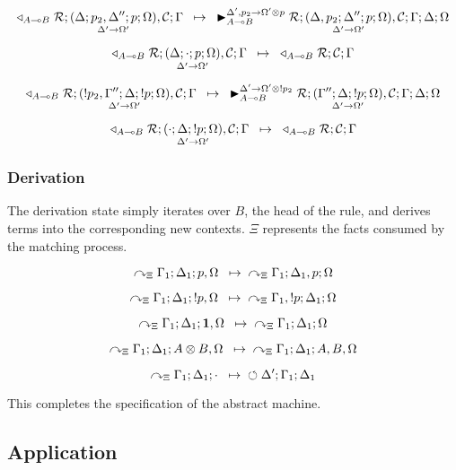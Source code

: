 \[
\trans{\contstate{A \lolli B}{\rulestk}{\lframe{\Delta}{p_2,
   \Delta''}{p}{\Omega}{\Delta'}{\Omega'}, \lstack{C}}{\Gamma}}
{
   \matstate{A \lolli B}{\rulestk}{\lframe{\Delta,
      p_2}{\Delta''}{p}{\Omega}{\Delta'}{\Omega'},
   \lstack{C}}{\Gamma}{\Delta}{\Omega}{\Delta', p_2 \rightarrow \Omega' \otimes p}}
\]

\[
\trans{\contstate{A \lolli
   B}{\rulestk}{\lframe{\Delta}{\cdot}{p}{\Omega}{\Delta'}{\Omega'},
      \lstack{C}}{\Gamma}}
{
   \contstate{A \lolli B}{\rulestk}{\lstack{C}}{\Gamma}}
\]

\[
\trans{\contstate{A \lolli B}{\rulestk}{\pframe{\bang p_2,
   \Gamma''}{\Delta}{\bang p}{\Omega}{\Delta'}{\Omega'}, \lstack{C}}{\Gamma}}
{
   \matstate{A \lolli B}{\rulestk}{\pframe{\Gamma''}{\Delta}{\bang
      p}{\Omega}{\Delta'}{\Omega'}, \lstack{C}}{\Gamma}{\Delta}{\Omega}{\Delta'
         \rightarrow \Omega' \otimes \bang p_2}}
\]

\[
\trans{\contstate{A \lolli B}{\rulestk}{\pframe{\cdot}{\Delta}{\bang
   p}{\Omega}{\Delta'}{\Omega'}, \lstack{C}}{\Gamma}}
{
   \contstate{A \lolli B}{\rulestk}{\lstack{C}}{\Gamma}}
\]

\subsubsection{Derivation}

The derivation state simply iterates over $B$, the head of the rule, and derives
terms into the corresponding new contexts. $\Xi$ represents the facts consumed
by the matching process.

\[
\trans{\derstate{\Xi}{\Gamma_1}{\Delta_1}{p, \Omega}}
{\derstate{\Xi}{\Gamma_1}{\Delta_1, p}{\Omega}}
\]

\[
\trans{\derstate{\Xi}{\Gamma_1}{\Delta_1}{\bang p, \Omega}}
{\derstate{\Xi}{\Gamma_1, \bang p}{\Delta_1}{\Omega}}
\]

\[
\trans{\derstate{\Xi}{\Gamma_1}{\Delta_1}{\one, \Omega}}
{\derstate{\Xi}{\Gamma_1}{\Delta_1}{\Omega}}
\]

\[
\trans{\derstate{\Xi}{\Gamma_1}{\Delta_1}{A \otimes B, \Omega}}
{\derstate{\Xi}{\Gamma_1}{\Delta_1}{A, B, \Omega}}
\]

\[
\trans{\derstate{\Xi}{\Gamma_1}{\Delta_1}{\cdot}}
{\finalstate{\Delta'}{\Gamma_1}{\Delta_1}}
\]

This completes the specification of the abstract machine.

\subsection{Application}

